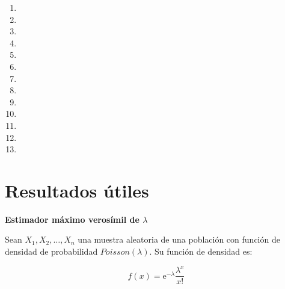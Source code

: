 \begin{appendices}
\begin{enumerate}
  \item 
  
  \item 
  
  \item 
  
  \item 
  
  \item 
  
  \item 
  
  \item 
  
  \item 
  
  \item 
  
  \item 
  
  \item 
  
  \item 
  
  \item 
\end{enumerate}




\chapter{Resultados útiles} %

\begin{defn} \label{EMVlambda}
\textbf{Estimador máximo verosímil de $\lambda$}

Sean $X_{1}, X_{2}, \ldots, X_{n}$ una muestra aleatoria de una población con función de densidad de probabilidad $Poisson(\lambda)$. Su función de densidad es:

\begin{equation}
f(x) = \mathrm{e}^{-\lambda} \dfrac{\lambda^{x}}{x!}
\end{equation}


\end{defn}
\end{appendices}
